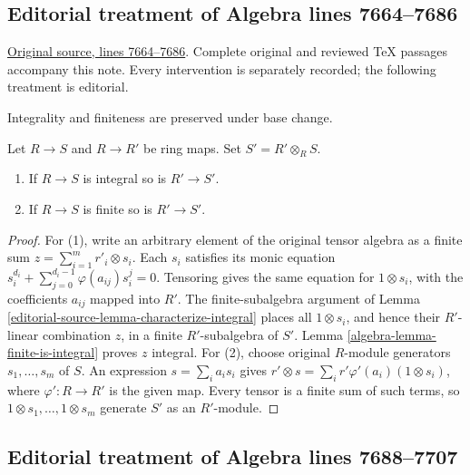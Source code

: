 \subsection{Editorial treatment of Algebra lines 7664--7686}

\hypertarget{algebra-context-077}{}

\noindent\href{https://github.com/stacks/stacks-project/blob/a04446e57ec1fbc252a871afcec7752fb2807b14/algebra.tex\#L7664}{Original source, lines 7664--7686}. Complete original and reviewed TeX passages accompany this note. Every intervention is separately recorded; the following treatment is editorial.


\begin{lemma}
\label{editorial-source-lemma-base-change-integral}
\begin{slogan}
Integrality and finiteness are preserved under base change.
\end{slogan}
Let $R \to S$ and $R \to R'$ be ring maps.
Set $S' = R' \otimes_R S$.
\begin{enumerate}
\item If $R \to S$ is integral so is $R' \to S'$.
\item If $R \to S$ is finite so is $R' \to S'$.
\end{enumerate}
\end{lemma}

\begin{proof}
For (1), write an arbitrary element of the original tensor algebra
as a finite sum $z=\sum_{i=1}^m r'_i\otimes s_i$.
Each $s_i$ satisfies its monic equation
$s_i^{d_i}+\sum_{j=0}^{d_i-1}\varphi(a_{ij})s_i^j=0$.
Tensoring gives the same equation for $1\otimes s_i$, with the
coefficients $a_{ij}$ mapped into $R'$. The finite-subalgebra
argument of Lemma \ref{editorial-source-lemma-characterize-integral} places all
$1\otimes s_i$, and hence their $R'$-linear combination $z$,
in a finite $R'$-subalgebra of $S'$. Lemma
\ref{algebra-lemma-finite-is-integral} proves $z$ integral.
For (2), choose original $R$-module generators $s_1,\ldots,s_m$
of $S$. An expression $s=\sum_i a_i s_i$ gives
$r'\otimes s=\sum_i r'\varphi'(a_i)(1\otimes s_i)$, where
$\varphi':R\to R'$ is the given map. Every tensor is a finite
sum of such terms, so $1\otimes s_1,\ldots,1\otimes s_m$
generate $S'$ as an $R'$-module.
\end{proof}


\subsection{Editorial treatment of Algebra lines 7688--7707}

